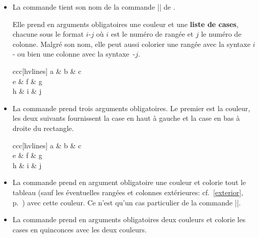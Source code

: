 \documentclass[dvipsnames]{article}
\begin{document}
\medskip
\begin{itemize}[beginpenalty=10000]
\item La commande  tient son nom de la
commande |\cellcolor| de .

Elle prend en arguments obligatoires une couleur et une \textbf{liste de cases}, chacune
sous le format $i$-$j$ où $i$ est le numéro de rangée et $j$ le numéro de colonne.
Malgré son nom, elle peut aussi colorier une rangée avec la syntaxe $i$-
ou bien une colonne avec la syntaxe~-$j$.

\medskip
\begin{Code}[width=10cm,show-output,no-cell-nodes]
\begin{NiceTabular}{ccc}[hvlines]
\CodeBefore
  \emph{}
\Body
  a & b & c \\ 
  e & f & g \\ 
  h & i & j \\ 
\end{NiceTabular}
\end{Code}

\medskip
\item La commande  prend trois
arguments obligatoires. Le premier est la couleur, les deux suivants fournissent
la case en haut à gauche et la case en bas à droite du rectangle.

\medskip
\begin{Code}[width=10cm,show-output,no-cell-nodes]
\begin{NiceTabular}{ccc}[hvlines]
\CodeBefore
  \emph{}
\Body
  a & b & c \\ 
  e & f & g \\ 
  h & i & j \\ 
\end{NiceTabular}
\end{Code}


\medskip
\item La commande  prend en argument
obligatoire une couleur et colorie tout le tableau (sauf les éventuelles rangées
et colonnes extérieures: cf.~\ref{exterior}, p.~\pageref{exterior}) avec cette
couleur. Ce n'est qu'un cas particulier de la commande |\rectanglecolor|.

\medskip
\item \label{chessboardcolors}%
La commande  prend en arguments
obligatoires deux couleurs et colorie les cases en quinconces avec les deux
couleurs.


\end{itemize}
\end{document}
